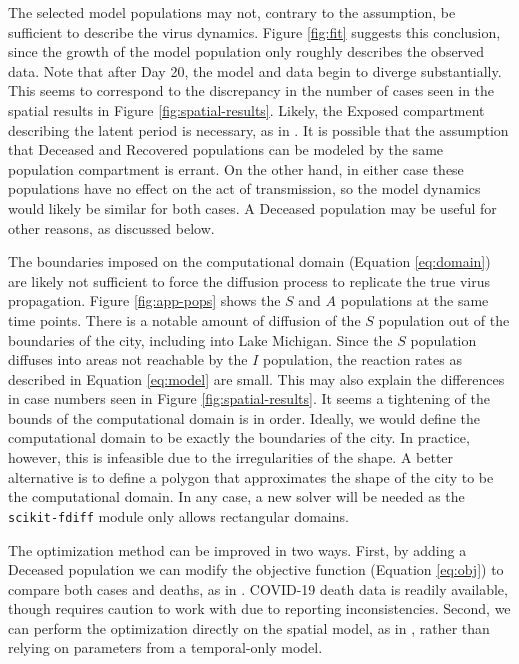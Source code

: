 \documentclass[11pt]{article}
\begin{document}
	The selected model populations may not, contrary to the assumption, be sufficient to describe the virus dynamics.
	Figure \ref{fig:fit} suggests this conclusion, since the growth of the model population only roughly describes the observed data.
	Note that after Day 20, the model and data begin to diverge substantially.
	This seems to correspond to the discrepancy in the number of cases seen in the spatial results in Figure \ref{fig:spatial-results}.
	Likely, the Exposed compartment describing the latent period is necessary, as in \cite{Mammeri+2020+102+113}.
	It is possible that the assumption that Deceased and Recovered populations can be modeled by the same population compartment is errant.
	On the other hand, in either case these populations have no effect on the act of transmission, so the model dynamics would likely be similar for both cases.
	A Deceased population may be useful for other reasons, as discussed below.
	
	The boundaries imposed on the computational domain (Equation \ref{eq:domain}) are likely not sufficient to force the diffusion process to replicate the true virus propagation.
	Figure \ref{fig:app-pops} shows the $S$ and $A$ populations at the same time points.
	There is a notable amount of diffusion of the $S$ population out of the boundaries of the city, including into Lake Michigan.
	Since the $S$ population diffuses into areas not reachable by the $I$ population, the reaction rates as described in Equation \ref{eq:model} are small.
	This may also explain the differences in case numbers seen in Figure \ref{fig:spatial-results}.
	It seems a tightening of the bounds of the computational domain is in order.
	Ideally, we would define the computational domain to be exactly the boundaries of the city.
	In practice, however, this is infeasible due to the irregularities of the shape.
	A better alternative is to define a polygon that approximates the shape of the city to be the computational domain.
	In any case, a new solver will be needed as the \verb|scikit-fdiff| module only allows rectangular domains.
	
	The optimization method can be improved in two ways.
	First, by adding a Deceased population we can modify the objective function (Equation \ref{eq:obj}) to compare both cases and deaths, as in \cite{Kevrekidis-2021}.
	COVID-19 death data is readily available, though requires caution to work with due to reporting inconsistencies.
	Second, we can perform the optimization directly on the spatial model, as in \cite{Mammeri+2020+102+113}, rather than relying on parameters from a temporal-only model.
	
\end{document}
